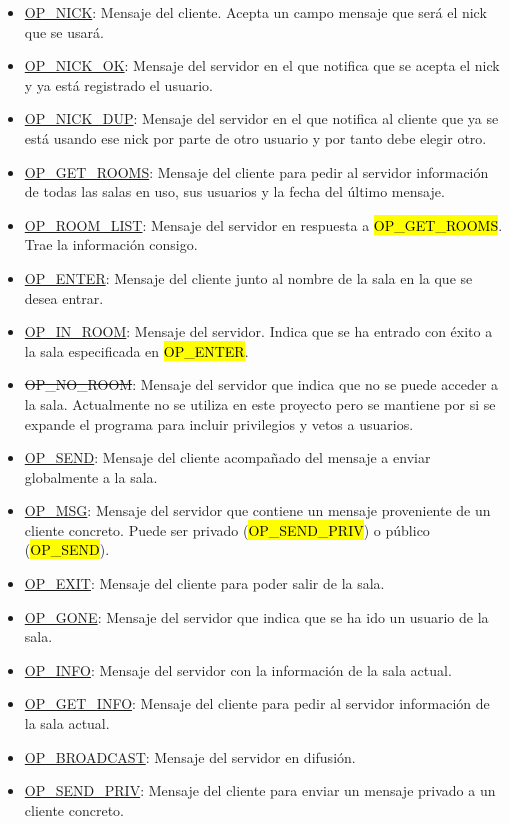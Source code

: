 \documentclass{article}
\begin{document}
\begin{itemize}
\item \ul{OP\_NICK}: Mensaje del cliente. Acepta un campo mensaje que será el nick que se usará.
\item \ul{OP\_NICK\_OK}: Mensaje del servidor en el que notifica que se acepta el nick y ya está registrado el usuario.
\item \ul{OP\_NICK\_DUP}: Mensaje del servidor en el que notifica al cliente que ya se está usando ese nick por parte de otro usuario y por tanto debe elegir otro.
\item \ul{OP\_GET\_ROOMS}: Mensaje del cliente para pedir al servidor información de todas las salas en uso, sus usuarios y la fecha del último mensaje.
\item \ul{OP\_ROOM\_LIST}: Mensaje del servidor en respuesta a \hl{OP\_GET\_ROOMS}. Trae la información consigo.
\item \ul{OP\_ENTER}: Mensaje del cliente junto al nombre de la sala en la que se desea entrar.
\item \ul{OP\_IN\_ROOM}: Mensaje del servidor. Indica que se ha entrado con éxito a la sala especificada en \hl{OP\_ENTER}.
\item \st{OP\_NO\_ROOM}: Mensaje del servidor que indica que no se puede acceder a la sala. Actualmente no se utiliza en este proyecto pero se mantiene por si se expande el programa para incluir privilegios y vetos a usuarios.
\item \ul{OP\_SEND}: Mensaje del cliente acompañado del mensaje a enviar globalmente a la sala.
\item \ul{OP\_MSG}: Mensaje del servidor que contiene un mensaje proveniente de un cliente concreto. Puede ser privado (\hl{OP\_SEND\_PRIV}) o público (\hl{OP\_SEND}).
\item \ul{OP\_EXIT}: Mensaje del cliente para poder salir de la sala.   
\item \ul{OP\_GONE}: Mensaje del servidor que indica que se ha ido un usuario de la sala.
\item \ul{OP\_INFO}: Mensaje del servidor con la información de la sala actual.
\item \ul{OP\_GET\_INFO}: Mensaje del cliente para pedir al servidor información de la sala actual.
\item \ul{OP\_BROADCAST}: Mensaje del servidor en difusión.
\item \ul{OP\_SEND\_PRIV}: Mensaje del cliente para enviar un mensaje privado a un cliente concreto.
\end{itemize}
\end{document}
